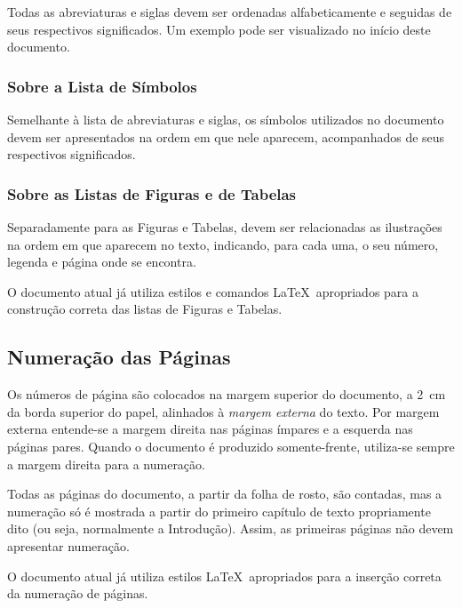 \documentclass[rel_mlp]{iiufrgs}
\begin{document}
Todas as abreviaturas e siglas devem ser ordenadas alfabeticamente e seguidas de seus respectivos significados. Um exemplo pode ser visualizado no início deste documento. 



\subsubsection{Sobre a Lista de Símbolos}

Semelhante à lista de abreviaturas e siglas, os símbolos utilizados no documento devem ser apresentados na ordem em que nele aparecem, acompanhados de seus respectivos significados. 



\subsubsection{Sobre as Listas de Figuras e de Tabelas}

Separadamente para as Figuras e Tabelas, devem ser relacionadas as ilustrações na ordem em que aparecem no texto, indicando, para cada uma, o seu número, legenda e página onde se encontra.

O documento atual já utiliza estilos e comandos \LaTeX\ apropriados para a construção correta das listas de Figuras e Tabelas. 



\subsection{Numeração das Páginas}

Os números de página são colocados na margem superior do documento, a 2~cm da borda superior do papel, alinhados à {\it margem externa} do texto. Por margem externa entende-se a margem direita nas páginas ímpares e a esquerda nas páginas pares. Quando o documento é produzido somente-frente, utiliza-se sempre a margem direita para a numeração. 

Todas as páginas do documento, a partir da folha de rosto, são contadas, mas a numeração só é mostrada a partir do primeiro capítulo de texto propriamente dito (ou seja, normalmente a Introdução). Assim, as primeiras páginas não devem apresentar numeração.

O documento atual já utiliza estilos \LaTeX\ apropriados para a inserção correta da numeração de páginas. 



%
\end{document}
